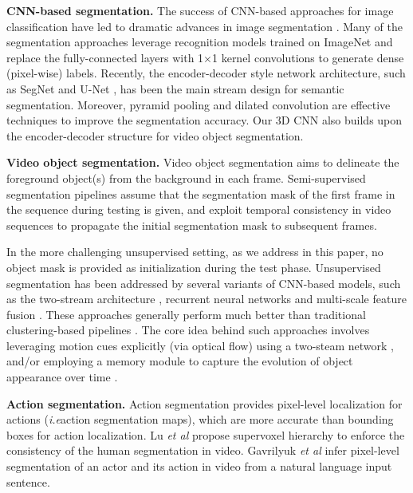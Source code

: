 \documentclass{bmvc2k}
\def\etal{\emph{et al}\bmvaOneDot}
\def\ie{\emph{i.e}\bmvaOneDot}
\begin{document}
\textbf{CNN-based segmentation.} The success of CNN-based approaches for image classification \cite{krizhevsky2012imagenet, he2016deep} have led to dramatic advances in image segmentation \cite{long2015fully, noh2015learning}. Many of the segmentation approaches leverage recognition models trained on ImageNet and replace the fully-connected layers with 1$\times$1 kernel convolutions to generate dense (pixel-wise) labels. Recently, the encoder-decoder style network architecture, such as SegNet \cite{badrinarayanan2015segnet} and U-Net \cite{ronneberger2015u}, has been the main stream design for semantic segmentation. Moreover, pyramid pooling \cite{zhao2017pyramid, chen2017rethinking} and dilated convolution \cite{yu2015multi, chen2017rethinking, chen2018deeplab} are effective techniques to improve the segmentation accuracy. Our 3D CNN also builds upon the encoder-decoder structure for video object segmentation. 

\textbf{Video object segmentation.} Video object segmentation \cite{ke2007event, yan2008learning} aims to delineate the foreground object(s) from the background in each frame. Semi-supervised segmentation pipelines \cite{Maninis2018Video,Voigtlaender2017Online} assume that the segmentation mask of the first frame in the sequence during testing is given, 
and exploit temporal consistency in video sequences to propagate the initial segmentation mask to subsequent frames.

In the more challenging unsupervised setting, as we address in this paper, no object mask is provided as initialization during the test phase.
Unsupervised segmentation has been addressed by several variants of CNN-based models, such as the two-stream architecture \cite{khoreva2016learning,caelles2017one}, recurrent neural networks \cite{Song_2018_ECCV, tokmakov2017learning} and multi-scale feature fusion \cite{tokmakov2016learning, Song_2018_ECCV}. These approaches generally perform much better than traditional clustering-based pipelines \cite{Chang2013A}. The core idea behind such approaches involves leveraging motion cues explicitly (via optical flow) using a two-steam network \cite{jain2017fusionseg,tokmakov2016learning,tokmakov2017learning}, and/or employing a memory module to capture the evolution of object appearance over time \cite{Song_2018_ECCV,tokmakov2017learning}.


\textbf{Action segmentation.} Action segmentation provides pixel-level localization for actions (\ie action segmentation maps), which are more accurate than bounding boxes for action localization. Lu \etal \cite{lu2015human} propose supervoxel hierarchy to enforce the consistency of the human segmentation in video. Gavrilyuk \etal \cite{gavrilyuk2018actor} infer pixel-level segmentation of an actor and its action in video from a
natural language input sentence. 
\end{document}
